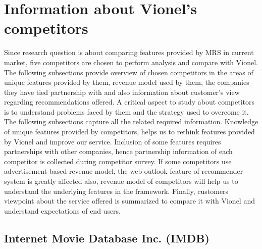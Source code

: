 \section{Information about Vionel's competitors}
 Since research question is about comparing features provided by \acrshort{MRS} in current market, five competitors are chosen to perform analysis and compare with Vionel. The following subsections provide overview of chosen competitors in the areas of unique features provided by them, revenue model used by them, the companies they have tied partnership with and also information about customer's view regarding recommendations offered. A critical aspect to study about competitors is to understand problems faced by them and the strategy used to overcome it. The following subsections capture all the related required information. Knowledge of unique features provided by competitors, helps us to rethink features provided by Vionel and improve our service. Inclusion of some features requires partnerships with other companies, hence partnership information of each competitor is collected during competitor survey. If some competitors use advertisement based revenue model, the web outlook feature of recommender system is greatly affected also, revenue model of competitors will help us to understand the underlying features in the framework. Finally, customers viewpoint about the service offered is summarized to compare it with Vionel and understand expectations of end users.     

 \subsection{Internet Movie Database Inc. (IMDB)}
  \label{IMDB_overview} 
